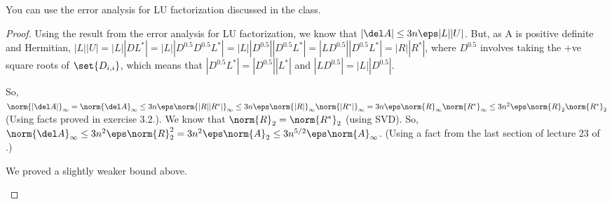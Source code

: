 \documentclass[10pt]{amsart}
\begin{document}
\begin{rem}
You can use the error analysis for LU factorization discussed in the class.
\end{rem}

\begin{proof}
Using the result from the error analysis for LU factorization, we know that $|\del A| \leq 3n\eps |L||U|$. But, as A is positive definite and Hermitian, $|L||U| = |L||DL^{*}| = |L||D^{0.5}D^{0.5}L^{*}| = |L||D^{0.5}||D^{0.5}L^{*}| = |LD^{0.5}||D^{0.5}L^{*}| = |R||R^{*}|$, where $D^{0.5}$ involves taking the +ve square roots of $\set{D_{i,i}}$, which means that $|D^{0.5}L^{*}| = |D^{0.5}||L^{*}|$ and $|LD^{0.5}| = |L||D^{0.5}|$.

So, $\norm{|\del A|}_{\infty} = \norm{\del A}_{\infty}\leq 3n\eps \norm{|R||R^{*}|}_{\infty} \leq 3n\eps \norm{|R|}_{\infty}\norm{|R^{*}|}_{\infty} = \\
3n\eps \norm{R}_{\infty}\norm{R^{*}}_{\infty} \leq 3n^{2}\eps \norm{R}_{2}\norm{R^{*}}_{2}$ (Using facts proved in exercise 3.2.). We know that $\norm{R}_{2} = \norm{R^{*}}_{2}$ (using SVD). So, $\norm{\del A}_{\infty} \leq 3n^{2}\eps \norm{R}_{2}^{2} = 3n^{2}\eps \norm{A}_{2} \leq 3n^{5/2}\eps \norm{A}_{\infty}$. (Using a fact from the last section of lecture 23 of \cite{trefBau}.)

\begin{rem}
We proved a slightly weaker bound above.
\end{rem}

\end{proof}




\end{document}
